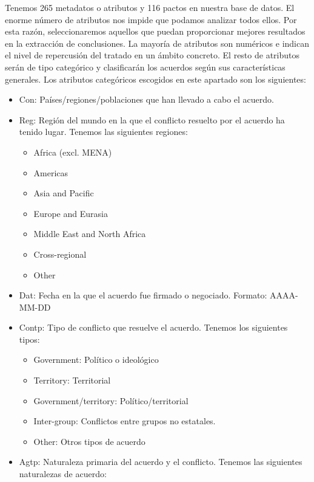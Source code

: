 \documentclass[11pt]{article}
\providecommand{\tightlist}{%
      \setlength{\itemsep}{0pt}\setlength{\parskip}{0pt}}
\begin{document}
    Tenemos 265 metadatos o atributos y 116 pactos en nuestra base de
datos. El enorme número de atributos nos impide que podamos analizar
todos ellos. Por esta razón, seleccionaremos aquellos que puedan
proporcionar mejores resultados en la extracción de conclusiones. La
mayoría de atributos son numéricos e indican el nivel de repercusión del
tratado en un ámbito concreto. El resto de atributos serán de tipo
categórico y clasificarán los acuerdos según sus características
generales. Los atributos categóricos escogidos en este apartado son los
siguientes:

\begin{itemize}
\tightlist
\item
  Con: Países/regiones/poblaciones que han llevado a cabo el acuerdo.
\item
  Reg: Región del mundo en la que el conflicto resuelto por el acuerdo
  ha tenido lugar. Tenemos las siguientes regiones:

  \begin{itemize}
  \tightlist
  \item
    Africa (excl. MENA)
  \item
    Americas
  \item
    Asia and Pacific
  \item
    Europe and Eurasia
  \item
    Middle East and North Africa
  \item
    Cross-regional
  \item
    Other
  \end{itemize}
\item
  Dat: Fecha en la que el acuerdo fue firmado o negociado. Formato:
  AAAA-MM-DD
\item
  Contp: Tipo de conflicto que resuelve el acuerdo. Tenemos los
  siguientes tipos:

  \begin{itemize}
  \tightlist
  \item
    Government: Político o ideológico
  \item
    Territory: Territorial
  \item
    Government/territory: Político/territorial
  \item
    Inter-group: Conflictos entre grupos no estatales.
  \item
    Other: Otros tipos de acuerdo
  \end{itemize}
\item
  Agtp: Naturaleza primaria del acuerdo y el conflicto. Tenemos las
  siguientes naturalezas de acuerdo:


\end{itemize}
\end{document}
